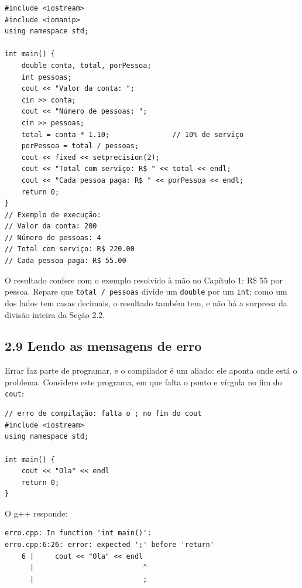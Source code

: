 \begin{codigo}
\begin{Verbatim}[breaklines=true, breaksymbolleft={}, fontsize=\footnotesize]
#include <iostream>
#include <iomanip>
using namespace std;

int main() {
    double conta, total, porPessoa;
    int pessoas;
    cout << "Valor da conta: ";
    cin >> conta;
    cout << "Número de pessoas: ";
    cin >> pessoas;
    total = conta * 1.10;               // 10% de serviço
    porPessoa = total / pessoas;
    cout << fixed << setprecision(2);
    cout << "Total com serviço: R$ " << total << endl;
    cout << "Cada pessoa paga: R$ " << porPessoa << endl;
    return 0;
}
// Exemplo de execução:
// Valor da conta: 200
// Número de pessoas: 4
// Total com serviço: R$ 220.00
// Cada pessoa paga: R$ 55.00
\end{Verbatim}
\end{codigo}

O resultado confere com o exemplo resolvido à mão no Capítulo 1: R\$ 55 por pessoa. Repare que \texttt{total / pessoas} divide um \texttt{double} por um \texttt{int}; como um dos lados tem casas decimais, o resultado também tem, e não há a surpresa da divisão inteira da Seção 2.2.

\subsection{2.9 Lendo as mensagens de erro}

Errar faz parte de programar, e o compilador é um aliado: ele aponta onde está o problema. Considere este programa, em que falta o ponto e vírgula no fim do \texttt{cout}:

\begin{codigo}
\begin{Verbatim}[breaklines=true, breaksymbolleft={}, fontsize=\footnotesize]
// erro de compilação: falta o ; no fim do cout
#include <iostream>
using namespace std;

int main() {
    cout << "Ola" << endl
    return 0;
}
\end{Verbatim}
\end{codigo}

O g++ responde:

\begin{codigo}
\begin{Verbatim}[breaklines=true, breaksymbolleft={}, fontsize=\footnotesize]
erro.cpp: In function 'int main()':
erro.cpp:6:26: error: expected ';' before 'return'
    6 |     cout << "Ola" << endl
      |                          ^
      |                          ;
\end{Verbatim}
\end{codigo}

